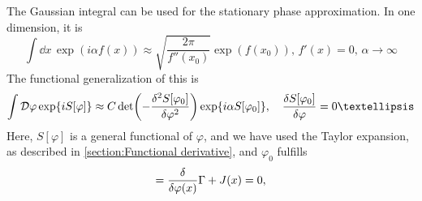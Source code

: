 The Gaussian integral can be used for the stationary phase approximation.
In one dimension, it is
\begin{equation}
    \int \dd x \, \exp(i \alpha f(x)) 
    \approx \sqrt{\frac{2 \pi }{f''(x_0)}}\exp( f(x_0)), 
    \, f'(x) = 0, \, \alpha\rightarrow \infty
\end{equation}
The functional generalization of this is
\begin{equation}
    \int \D \varphi \exp{i S[\varphi]}
    \approx 
    C \det(- \frac{\delta^2 S[\varphi_0]}{\delta \varphi^2})
    \exp{i \alpha S[\varphi_0]  }, \quad
    \frac{\delta S[\varphi_0]}{\delta \varphi} = 0…
\end{equation}
Here, $S[\varphi]$ is a general functional of $\varphi$, and we have used the Taylor expansion, as described in \autoref{section:Functional derivative}, and $\varphi_0$ fulfills
\begin{equation}
    = \frac{\delta }{\delta \varphi(x)}{\Gamma} + J(x) = 0,
\end{equation}

